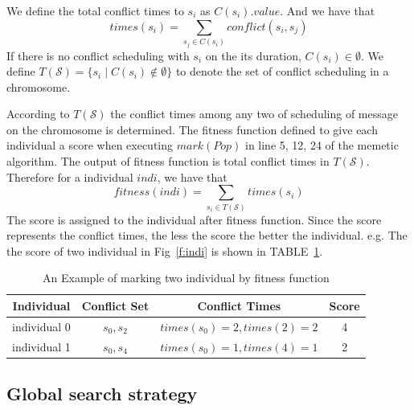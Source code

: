 \documentclass[journal]{IEEEtran}
\newcommand{\calS}{\mathcal{S}}
\begin{document}
We define the total conflict times to $s_{i}$ as $C(s_i).value$. And we have that
\begin{equation}
	times(s_i)=\sum_{ s_j \in C(s_i) } conflict(s_i,s_j)
\end{equation}
If there is no conflict scheduling with $s_i$ on the its duration,
 $C(s_i)\in \emptyset$.
We define $T(\calS) = \{ s_i \mid C(s_i) \notin \emptyset \} $ to denote the set of conflict scheduling in a chromosome.

According to $T(\calS)$ the conflict times among any two of scheduling of message on the chromosome is determined.
The fitness function defined to give each individual a score when executing $mark(Pop)$ in line 5, 12, 24 of the memetic algorithm.
The output of fitness function is total conflict times in $T(\calS)$.
Therefore for a individual $indi$, we have that
\begin{equation}
	fitness(indi)=\sum_{s_i \in T(\calS)} {times(s_i)}
\end{equation}
The score is assigned to the individual after fitness function.
Since the score represents the conflict times, the less the score the better the individual.
e.g. The the score of two individual in Fig~\ref{f:indi} is shown in TABLE~\ref{t:fitness}. 

\begin{table}[!t]
	\renewcommand{\arraystretch}{1.3}
	\caption{An Example of marking two individual by fitness function}
	\label{t:fitness}
	\centering
	\begin{tabular}{|c||c||c||c|}
		\hline
		\textbf{Individual} & \textbf{Conflict Set} &\textbf{Conflict Times} &Score\\
		\hline 
		individual 0 &$s_0,s_2$ & $times(s_0)=2,times(2)=2$ &4\\
		\hline
		individual 1 & $s_0,s_4$& $times(s_0)=1,times(4)=1$ &2\\
		\hline
		\end{tabular}	
\end{table}

\subsection{Global search strategy \label{s:glo}}
\end{document}

